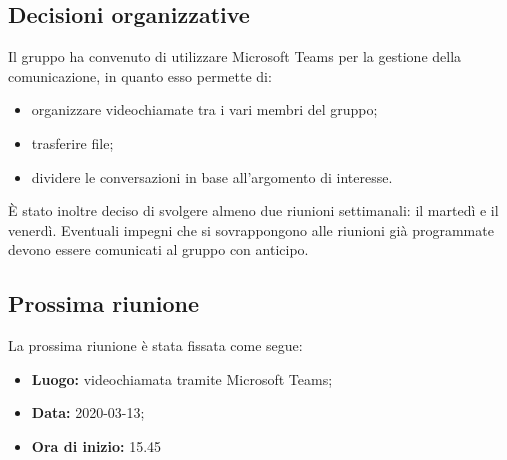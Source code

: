 \subsection{Decisioni organizzative}
Il gruppo ha convenuto di utilizzare Microsoft Teams per la gestione della comunicazione, in quanto esso permette di: 
\begin{itemize}
	\item organizzare videochiamate tra i vari membri del gruppo; 
	\item trasferire file; 
	\item dividere le conversazioni in base all'argomento di interesse.  
\end{itemize}
È stato inoltre deciso di svolgere almeno due riunioni settimanali: il martedì e il venerdì. Eventuali impegni che si sovrappongono alle riunioni già programmate devono essere comunicati al gruppo con anticipo. 

\subsection{Prossima riunione}
La prossima riunione è stata fissata come segue: 
\begin{itemize}
	\item \textbf{Luogo: } videochiamata tramite Microsoft Teams; 
	\item \textbf{Data: } 2020-03-13; 
	\item \textbf{Ora di inizio: } 15.45
\end{itemize}